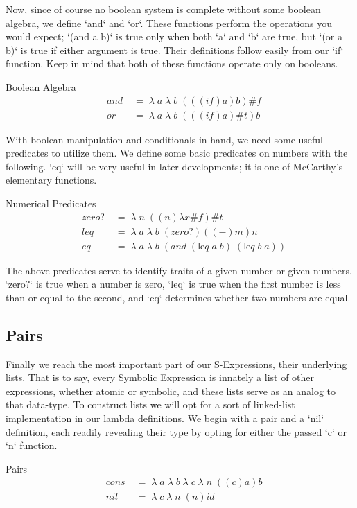 Now, since of course no boolean system is complete without some boolean algebra, 
we define `and` and `or`. These functions perform the operations you would expect; 
`(and a b)` is true only when both `a` and `b` are true, but `(or a b)` is true if 
either argument is true. Their definitions follow easily from our `if` function. 
Keep in mind that both of these functions operate only on booleans.

Boolean Algebra
\begin{align*}
& and \; &= \; \lambda \; a \; \lambda \; b \; (((if)a)b)\#f
\\& or \; &= \; \lambda \; a \; \lambda \; b \; (((if)a)\#t)b
\end{align*}

With boolean manipulation and conditionals in hand, we need some useful predicates 
to utilize them. We define some basic predicates on numbers with the following. 
`eq` will be very useful in later developments; it is one of McCarthy's elementary 
functions.

Numerical Predicates
\begin{align*}
& zero? \; &= \; \lambda \; n \; ((n)λx\#f)\#t
\\& leq \; &= \; \lambda \; a \; \lambda \; b \; (zero?)((-)m)n
\\& eq \; &= \; \lambda \; a \; \lambda \; b \; (and \; (\text{le}q \; a \; b) \; (\text{le}q \; b \; a))
\end{align*}

The above predicates serve to identify traits of a given number or given numbers. 
`zero?` is true when a number is zero, `leq` is true when the first number is less 
than or equal to the second, and `eq` determines whether two numbers are equal.

\subsection{Pairs}
Finally we reach the most important part of our S-Expressions, their underlying 
lists. That is to say, every Symbolic Expression is innately a list of other 
expressions, whether atomic or symbolic, and these lists serve as an analog to 
that data-type. To construct lists we will opt for a sort of linked-list 
implementation in our lambda definitions. We begin with a pair and a `nil` 
definition, each readily revealing their type by opting for either the passed `c` 
or `n` function.

Pairs
\begin{align*}
& cons \; &= \; \lambda \; a \; \lambda \; b \; \lambda \; c \; \lambda \; n \; ((c)a)b
\\& nil \; &= \; \lambda \; c \; \lambda \; n \; (n)id
\end{align*}

